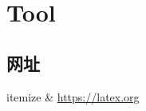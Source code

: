 \chapter{Tool}

\section{网址}

\begin{myeasylist}{itemize}
& \url{https://latex.org}
\end{myeasylist}
